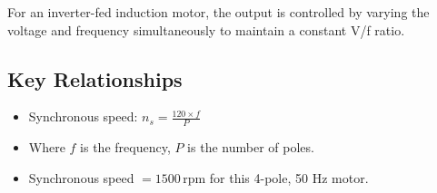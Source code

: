\documentclass[12pt]{report}
\begin{document}
	
	For an inverter-fed induction motor, the output is controlled by varying the voltage and frequency simultaneously to maintain a constant V/f ratio. 
	
	\subsection*{Key Relationships}
	\begin{itemize}
		\item Synchronous speed: \( n_s = \frac{120 \times f}{P} \)
		\item Where \( f \) is the frequency, \( P \) is the number of poles.
		\item Synchronous speed \( = 1500 \, \text{rpm} \) for this 4-pole, 50 Hz motor.
	\end{itemize}
	
\end{document}
